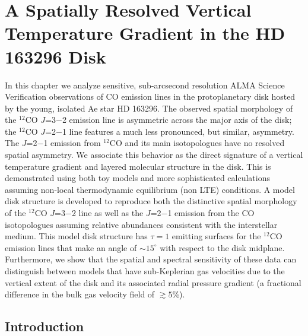 
\chapter{A Spatially Resolved Vertical Temperature Gradient in the HD 163296 Disk}\label{chap:hd163296}

In this chapter we analyze sensitive, sub-arcsecond resolution ALMA Science Verification 
observations of CO emission lines in the protoplanetary disk hosted by the 
young, isolated Ae star HD 163296.  The observed spatial morphology of the 
$^{12}$CO $J$=3$-$2 emission line is asymmetric across the major axis of the 
disk; the $^{12}$CO $J$=2$-$1 line features a much less pronounced, but similar,
asymmetry.  The $J$=2$-$1 emission from $^{12}$CO and its main isotopologues 
have no resolved spatial asymmetry.  We associate this behavior as the direct 
signature of a vertical temperature gradient and layered molecular structure in 
the disk.  This is demonstrated using both toy models and more sophisticated 
calculations assuming non-local thermodynamic equilibrium (non LTE) conditions. 
A model disk structure is developed to reproduce both the distinctive spatial 
morphology of the $^{12}$CO $J$=3$-$2 line as well as the $J$=2$-$1 emission 
from the CO isotopologues assuming relative abundances consistent with the 
interstellar medium.  This model disk structure has $\tau=1$ emitting surfaces 
for the $^{12}$CO emission lines that make an angle of $\sim 15^\circ$ with 
respect to the disk midplane.  Furthermore, we show that the spatial and 
spectral 
sensitivity of these data can distinguish between models that have 
sub-Keplerian gas velocities due to the vertical extent of the disk and its 
associated radial pressure gradient (a fractional difference in the bulk gas 
velocity field of $\gtrsim 5$\%).


\section{Introduction}

